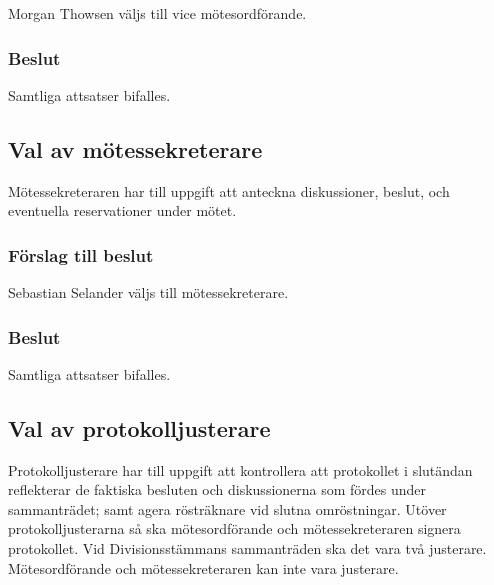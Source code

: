 \documentclass[protokoll]{dvd}
\begin{document}
\begin{attsatser}
	\item Morgan Thowsen väljs till vice mötesordförande.
\end{attsatser}

\subsubsection{Beslut}
\begin{attsatser}
	\item Samtliga attsatser bifalles.
\end{attsatser}

\subsection{Val av mötessekreterare}

Mötessekreteraren har till uppgift att anteckna diskussioner, beslut, och eventuella reservationer under mötet.

\subsubsection*{Förslag till beslut}

\begin{attsatser}
	\item Sebastian Selander väljs till mötessekreterare.
\end{attsatser}

\subsubsection{Beslut}
\begin{attsatser}
	\item Samtliga attsatser bifalles.
\end{attsatser}

\subsection{Val av protokolljusterare}

Protokolljusterare har till uppgift att kontrollera att protokollet i slutändan reflekterar de faktiska besluten och diskussionerna som fördes under sammanträdet; samt agera rösträknare vid slutna omröstningar.
Utöver protokolljusterarna så ska mötesordförande och mötessekreteraren signera protokollet.
Vid Divisionsstämmans sammanträden ska det vara två justerare.
Mötesordförande och mötessekreteraren kan inte vara justerare.
\end{document}
